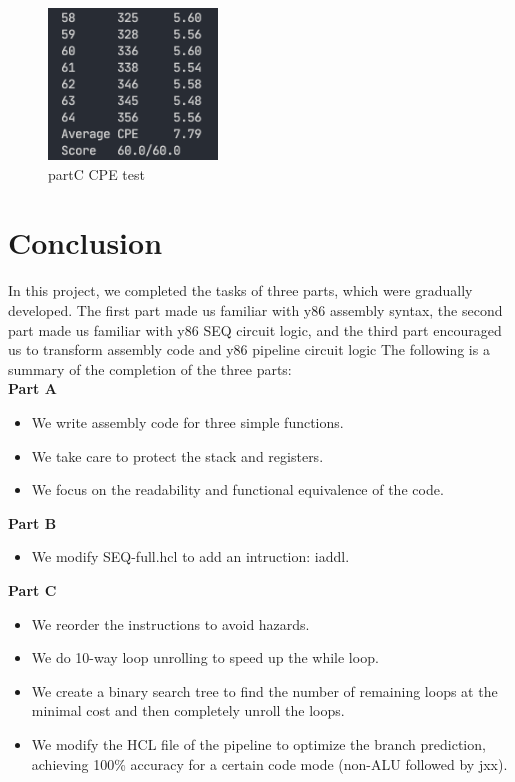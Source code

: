 \documentclass{article}
\begin{document}
\begin{figure}[H] %
        \centering %
        \includegraphics[width=0.4\textwidth]{partC-CPE-test.png} %
        \caption{partC CPE test} %
        \label{Fig.partC-CPE} %
\end{figure}
\section{Conclusion}
In this project, we completed the tasks of three parts, 
which were gradually developed. The first part made us familiar with y86 assembly syntax, 
the second part made us familiar with y86 SEQ circuit logic, and the third part encouraged us to transform assembly code and y86 pipeline circuit logic
The following is a summary of the completion of the three parts:\\
\textbf{Part A}
\begin{itemize}
        \item We write assembly code for three simple functions.
        \item We take care to protect the stack and registers.
        \item We focus on the readability and functional equivalence of the code.
\end{itemize}
\textbf{Part B}
\begin{itemize}
        \item We modify SEQ-full.hcl to add an intruction: iaddl.
\end{itemize}
\textbf{Part C}
\begin{itemize}
        \item We reorder the instructions to avoid hazards.
        \item We do 10-way loop unrolling to speed up the while loop.
        \item We create a binary search tree to find the number of remaining loops at the minimal cost and then completely unroll the loops.
        \item We modify the HCL file of the pipeline to optimize the branch prediction,  achieving 100\% accuracy for a certain code mode (non-ALU followed by jxx).
\end{itemize}
\end{document}
